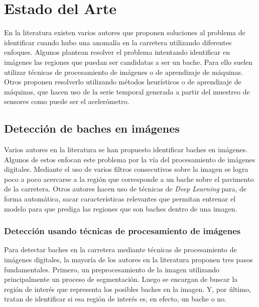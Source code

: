\chapter{Estado del Arte}\label{chapter:state-of-the-art}
En la literatura existen varios autores que proponen soluciones al problema de identificar cuando hubo una anomalía en la carretera utilizando
diferentes enfoques. Algunos plantean resolver el problema intentando identificar en imágenes las regiones que puedan ser candidatas a ser un 
bache. Para ello suelen utilizar técnicas de procesamiento de imágenes o de aprendizaje de máquinas. Otros proponen resolverlo utilizando métodos 
heurísticos o de aprendizaje de máquinas, que hacen uso de la serie temporal generada a partir del muestreo de sensores como puede ser el acelerómetro. 

\section{Detección de baches en imágenes}
Varios autores en la literatura se han propuesto identificar baches en imágenes. Algunos de estos enfocan este problema por la vía del
procesamiento de imágenes digitales. Mediante el uso de varios filtros consecutivos  sobre la imagen se logra poco a poco acercarse 
a la región que corresponde a un bache sobre el pavimento de la carretera.  Otros autores hacen uso de técnicas de \emph{Deep Learning}
para, de forma automática, sacar características relevantes que permitan entrenar el modelo para que prediga las regiones 
que son baches dentro de una imagen.

	\subsection{Detección usando técnicas de procesamiento de imágenes}

		Para detectar baches en la carretera mediante técnicas de procesamiento de imágenes digitales, la mayoría de los autores  en la literatura 
		proponen tres pasos fundamentales. Primero, un preprocesamiento de la imagen utilizando principalmente un proceso de segmentación. Luego 
		se encargan de buscar la región de interés que representa los posibles baches en la imagen. Y, por último, tratan de identificar si esa 
		región de interés es, en efecto, un bache o no. 
		
